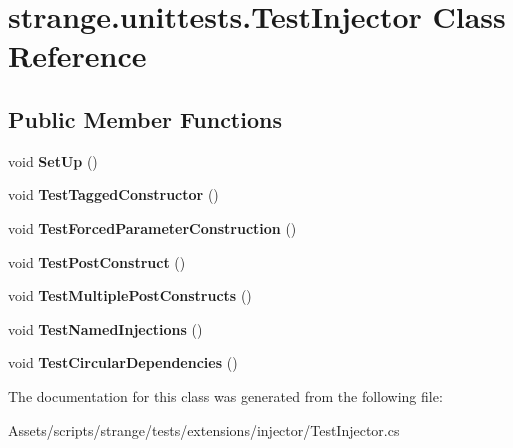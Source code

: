 \hypertarget{classstrange_1_1unittests_1_1_test_injector}{\section{strange.\-unittests.\-Test\-Injector Class Reference}
\label{classstrange_1_1unittests_1_1_test_injector}
}
\subsection*{Public Member Functions}
\begin{DoxyCompactItemize}
\item 
\hypertarget{classstrange_1_1unittests_1_1_test_injector_af2bf74a0ebd4f6cd43fe08c23626a9d1}{void {\bfseries Set\-Up} ()}\label{classstrange_1_1unittests_1_1_test_injector_af2bf74a0ebd4f6cd43fe08c23626a9d1}

\item 
\hypertarget{classstrange_1_1unittests_1_1_test_injector_a06cc36aa48eb66c6dbbe9a20d10fc43f}{void {\bfseries Test\-Tagged\-Constructor} ()}\label{classstrange_1_1unittests_1_1_test_injector_a06cc36aa48eb66c6dbbe9a20d10fc43f}

\item 
\hypertarget{classstrange_1_1unittests_1_1_test_injector_a4e5847dc13bc26f2e0a43238c38e2e12}{void {\bfseries Test\-Forced\-Parameter\-Construction} ()}\label{classstrange_1_1unittests_1_1_test_injector_a4e5847dc13bc26f2e0a43238c38e2e12}

\item 
\hypertarget{classstrange_1_1unittests_1_1_test_injector_a7e102b24ddcd50cefe34377f45173c2b}{void {\bfseries Test\-Post\-Construct} ()}\label{classstrange_1_1unittests_1_1_test_injector_a7e102b24ddcd50cefe34377f45173c2b}

\item 
\hypertarget{classstrange_1_1unittests_1_1_test_injector_a1aa34ff17771cfebf73c394a32cc1106}{void {\bfseries Test\-Multiple\-Post\-Constructs} ()}\label{classstrange_1_1unittests_1_1_test_injector_a1aa34ff17771cfebf73c394a32cc1106}

\item 
\hypertarget{classstrange_1_1unittests_1_1_test_injector_a1d322c964f399879b5b24da3da3e3159}{void {\bfseries Test\-Named\-Injections} ()}\label{classstrange_1_1unittests_1_1_test_injector_a1d322c964f399879b5b24da3da3e3159}

\item 
\hypertarget{classstrange_1_1unittests_1_1_test_injector_ac3bfa0919bf63ebeab8a3e31d6ab1736}{void {\bfseries Test\-Circular\-Dependencies} ()}\label{classstrange_1_1unittests_1_1_test_injector_ac3bfa0919bf63ebeab8a3e31d6ab1736}

\end{DoxyCompactItemize}


The documentation for this class was generated from the following file\-:\begin{DoxyCompactItemize}
\item 
Assets/scripts/strange/tests/extensions/injector/Test\-Injector.\-cs\end{DoxyCompactItemize}
